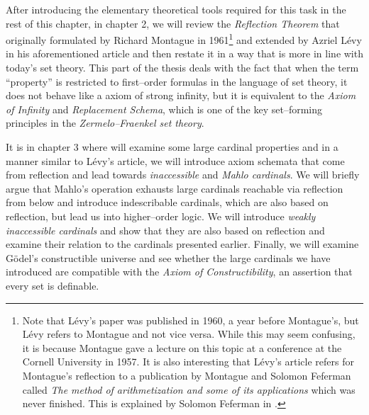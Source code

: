 After introducing the elementary theoretical tools required for this task in the rest of this chapter, in chapter 2, we will review the \emph{Reflection Theorem} that originally formulated by Richard Montague in 1961\footnote{Note that Lévy's paper was published in 1960, a year before Montague's, but Lévy refers to Montague and not vice versa. While this may seem confusing, it is because Montague gave a lecture on this topic at a conference at the Cornell University in 1957. It is also interesting that Lévy's article refers for Montague's reflection to a publication by Montague and Solomon Feferman called \emph{The method of arithmetization and some of its applications} which was never finished. This is explained by Solomon Feferman in \cite{Feferman2008}.} and extended by Azriel Lévy in his aforementioned article and then restate it in a way that is more in line with today's set theory. 
This part of the thesis deals with the fact that when the term ``property'' is restricted to first–order formulas in the language of set theory, it does not behave like a axiom of strong infinity, but it is equivalent to the \emph{Axiom of Infinity} and \emph{Replacement Schema}, which is one of the key set–forming principles in the \emph{Zermelo–Fraenkel set theory}.

It is in chapter 3 where will examine some large cardinal properties and in a manner similar to Lévy's article, we will introduce axiom schemata that come from reflection and lead towards \emph{inaccessible} and \emph{Mahlo cardinals}. We will briefly argue that Mahlo's operation exhausts large cardinals reachable via reflection from below and introduce indescribable cardinals, which are also based on reflection, but lead us into higher–order logic. We will introduce \emph{weakly inaccessible cardinals} and show that they are also based on reflection and examine their relation to the cardinals presented earlier. Finally, we will examine Gödel's constructible universe and see whether the large cardinals we have introduced are compatible with the \emph{Axiom of Constructibility}, an assertion that every set is definable.

